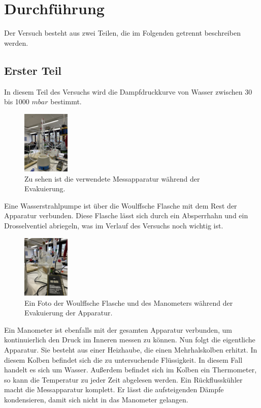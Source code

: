 \section{Durchführung}
\label{sec:Durchführung}

Der Versuch besteht aus zwei Teilen, die im Folgenden getrennt beschreiben werden.
\subsection{Erster Teil}
In diesem Teil des Versuchs wird die Dampfdruckkurve von Wasser zwischen 30 bis 1000 $mbar$ bestimmt.
\begin{figure}
    \centering
    \includegraphics[height=3cm, angle=270]{content/Verwendete_Messapparatur.jpeg}
    \caption{Zu sehen ist die verwendete Messapparatur während der Evakuierung.}
    \label{Abb:Messapparatur}
\end{figure}
Eine Wasserstrahlpumpe ist über die Woulffsche Flasche mit dem Rest der Apparatur verbunden.
Diese Flasche lässt sich durch ein Absperrhahn und ein Drosselventiel abriegeln, was im Verlauf des Versuchs noch wichtig ist.
\begin{figure}
    \centering
    \includegraphics[height=3cm, angle=270]{content/Woulffsche_Flasche.jpeg}
    \caption{Ein Foto der Woulffsche Flasche und des Manometers während der Evakuierung der Apparatur.}
    \label{Abb:Woulffsche_Flasche}
\end{figure}
Ein Manometer ist ebenfalls mit der gesamten Apparatur verbunden, um kontinuierlich den Druck im Inneren messen zu können.
Nun folgt die eigentliche Apparatur.
Sie besteht aus einer Heizhaube, die einen Mehrhalskolben erhitzt.
In diesem Kolben befindet sich die zu untersuchende Flüssigkeit.
In diesem Fall handelt es sich um Wasser.
Außerdem befindet sich im Kolben ein Thermometer, so kann die Temperatur zu jeder Zeit abgelesen werden.
Ein Rückflusskühler macht die Messapparatur komplett.
Er lässt die aufsteigenden Dämpfe kondensieren, damit sich nicht in das Manometer gelangen.

